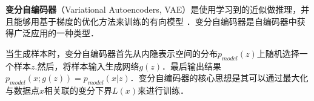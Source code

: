 
\textbf{变分自编码器}（Variational Autoencoders, VAE）是使用学习到的近似做推理，并且能够用基于梯度的优化方法来训练的有向模型 \cite{GDL}．变分自编码器是自编码器中获得广泛应用的一种类型．

当生成样本时，变分自编码器首先从内隐表示空间的分布$p_{model}(z)$上随机选择一个样本$z$.然后，将样本输入生成网络$g(z)$．最后输出结果$p_{model}(x;g(z))=p_{model}(x|z)$．变分自编码器的核心思想是其可以通过最大化与数据点$x$相关联的变分下界$L(x)$来进行训练．

